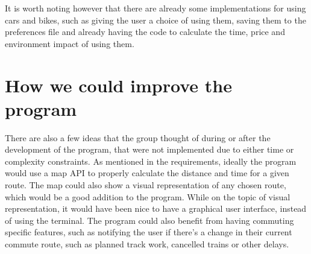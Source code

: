 It is worth noting however that there are already some implementations for using cars and bikes, such as giving the
user a choice of using them, saving them to the preferences file and already having the code to calculate the time,
price and environment impact of using them.

\section{How we could improve the program}\label{sec:improve-program}

There are also a few ideas that the group thought of during or after the development of the program, that were not
implemented due to either time or complexity constraints.
As mentioned in the requirements, ideally the program would use a map API to properly calculate the distance and time
for a given route.
The map could also show a visual representation of any chosen route, which would be a good addition to the program.
While on the topic of visual representation, it would have been nice to have a graphical user interface, instead of
using the terminal.
The program could also benefit from having commuting specific features, such as notifying the user if there's a change
in their current commute route, such as planned track work, cancelled trains or other delays.

